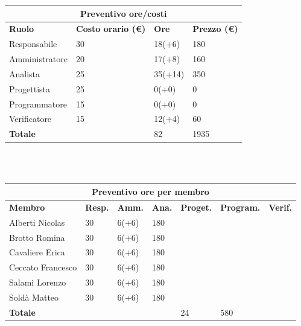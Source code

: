 \documentclass[a4paper, 12pt]{article}
\begin{document}
\begin{center}
	\begin{tabularx}{\textwidth}{|X|X|X|X|}
		\hline
		\multicolumn{4}{|c|}{\textbf{Preventivo ore/costi}}                                      \\
		\hline
		\hline
		\textbf{Ruolo}  & \textbf{Costo orario (\euro)} & \textbf{Ore} & \textbf{Prezzo (\euro)} \\
		\hline
		Responsabile    & 30                            & 18(+6)       & 180                     \\
		\hline
		Amministratore  & 20                            & 17(+8)       & 160                     \\
		\hline
		Analista        & 25                            & 35(+14)      & 350                     \\
		\hline
		Progettista     & 25                            & 0(+0)        & 0                       \\
		\hline
		Programmatore   & 15                            & 0(+0)        & 0                       \\
		\hline
		Verificatore    & 15                            & 12(+4)       & 60                      \\
		\hline
		\hline
		\textbf{Totale} &                               & 82           & 1935                    \\
		\hline
	\end{tabularx}\\[8pt]
	\mbox{}\\
\end{center}

\begin{center}
	\begin{tabularx}{\textwidth}{|X|X|X|X|X|X|X|}
		\hline
		\multicolumn{7}{|c|}{\textbf{Preventivo ore per membro}}                                      \\
		\hline
		\hline
		\textbf{Membro}  & \textbf{Resp.} & \textbf{Amm.} & \textbf{Ana.} &
		\textbf{Proget.} & \textbf{Program.} & \textbf{Verif.} \\
		\hline
		Alberti Nicolas    	& 30 	& 6(+6)       & 180  & &  &                 \\
		\hline
		Brotto Romina    	& 30 	& 6(+6)       & 180  & &  &                 \\
		\hline
		Cavaliere Erica    	& 30 	& 6(+6)       & 180  & &  &                 \\
		\hline
		Ceccato Francesco    	& 30 	& 6(+6)       & 180  & &   &                \\
		\hline
		Salami Lorenzo    	& 30 	& 6(+6)       & 180  & &     &               \\
		\hline
		Soldà Matteo    	& 30 	& 6(+6)       & 180  & &   &                 \\
		\hline
		\hline
		\textbf{Totale} &    & & & 24           & 580      &               \\
		\hline
	\end{tabularx}\\[8pt]
	\mbox{}\\
\end{center}
\end{document}
